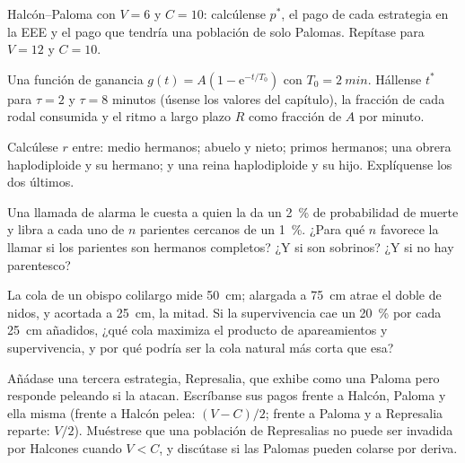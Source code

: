 \begin{exercise}[$\star\star$]\label{exo:b3:behavioural-ecology:5}
Halcón--Paloma con $V = 6$ y $C = 10$: calcúlense $p^{*}$, el pago de
cada estrategia en la EEE y el pago que tendría una población de solo
Palomas. Repítase para $V = 12$ y $C = 10$.
\end{exercise}

\begin{exercise}[$\star\star$]\label{exo:b3:behavioural-ecology:6}
Una función de ganancia $g(t) = A(1 - \mathrm{e}^{-t/T_{0}})$ con $T_{0} =
\qty{2}{min}$. Hállense $t^{*}$ para $\tau = 2$ y $\tau = 8$ minutos
(úsense los valores del capítulo), la fracción de cada rodal consumida
y el ritmo a largo plazo $R$ como fracción de $A$ por minuto.
\end{exercise}

\begin{exercise}[$\star\star$]\label{exo:b3:behavioural-ecology:7}
Calcúlese $r$ entre: medio hermanos; abuelo y nieto; primos hermanos;
una obrera haplodiploide y su hermano; y una reina haplodiploide y su
hijo. Explíquense los dos últimos.
\end{exercise}

\begin{exercise}[$\star\star$]\label{exo:b3:behavioural-ecology:8}
Una llamada de alarma le cuesta a quien la da un \qty{2}{\%} de
probabilidad de muerte y libra a cada uno de $n$ parientes cercanos de
un \qty{1}{\%}. ¿Para qué $n$ favorece la  llamar si
los parientes son hermanos completos? ¿Y si son sobrinos? ¿Y si no hay
parentesco?
\end{exercise}

\begin{exercise}[$\star\star$]\label{exo:b3:behavioural-ecology:9}
La cola de un obispo colilargo mide \qty{50}{cm}; alargada a
\qty{75}{cm} atrae el doble de nidos, y acortada a \qty{25}{cm}, la
mitad. Si la supervivencia cae un \qty{20}{\%} por cada \qty{25}{cm}
añadidos, ¿qué cola maximiza el producto de apareamientos y
supervivencia, y por qué podría ser la cola natural más corta que esa?
\end{exercise}

\begin{exercise}[$\star\star\star$]\label{exo:b3:behavioural-ecology:10}
Añádase una tercera estrategia, Represalia, que exhibe como una Paloma
pero responde peleando si la atacan. Escríbanse sus pagos frente a
Halcón, Paloma y ella misma (frente a Halcón pelea: $(V - C)/2$; frente
a Paloma y a Represalia reparte: $V/2$). Muéstrese que una población de
Represalias no puede ser invadida por Halcones cuando $V < C$, y
discútase si las Palomas pueden colarse por deriva.
\end{exercise}

